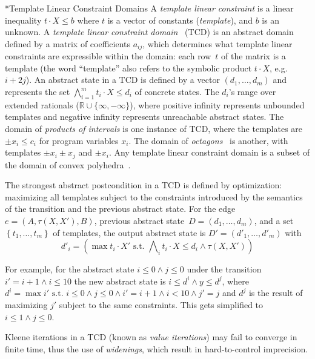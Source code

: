 \documentclass{llncs}
\makeatletter
\newcommand{\setof}[1]{\ensuremath{\left \{{#1}\right\}}}
\newcommand{\tuple}[1]{\ensuremath{\left( #1 \right) }}
\newcommand{\union}{\cup}
\newcommand{\Real}{\ensuremath{\mathbb{R}}}
\renewcommand{\paragraph}{\@startsection{paragraph}{4}{\z@}{0.8ex \@plus 0ex \@minus 1ex}{-1em}{\normalfont\normalsize\bfseries}}
\makeatother
\begin{document}
\paragraph*{Template Linear Constraint Domains}
A \emph{template linear constraint} is a linear inequality $t \cdot X \leq b$
where $t$ is a vector of constants (\emph{template}), and $b$ is an unknown.
A \emph{template linear constraint domain}~\cite{template_constraints_domain}
(TCD) is
an abstract domain defined by a matrix of coefficients $a_{ij}$, which
determines what template linear constraints are expressible within the domain:
each row~$t$ of the matrix is a template (the word ``template'' also refers to the symbolic product $t \cdot X$, e.g. $i + 2j$).
An abstract state in a TCD is defined by a vector
$(d_1,\dots,d_m)$ and represents the set
$\bigwedge_{i=1}^m t_i \cdot X \leq d_i$ of concrete states.
The $d_i$'s range over extended rationals ($\Real
\union \{\infty, -\infty\}$), where positive infinity represents unbounded templates and
negative infinity represents unreachable abstract states.
The domain of \emph{products of intervals} is one instance of TCD, where
the templates are $\pm x_i \leq c_i$ for program variables $x_i$.
The domain of \emph{octagons}~\cite{DBLP:journals/lisp/Mine06} is another, with
templates $\pm x_i \pm x_j$ and $\pm x_i$.
Any template linear constraint domain is a subset of the domain of convex polyhedra~\cite{cousot78}.

The strongest abstract postcondition in a TCD is
defined by optimization: maximizing all templates subject to the
constraints introduced by the
semantics of the transition and the previous abstract state.
For the edge $e = \tuple{A, \tau(X, X'), B}$, previous abstract state~$D = \tuple{d_1, \dots, d_m}$, and a set~$\setof{t_1, \dots, t_m}$ of templates,
the output abstract state is $D' = \tuple{d'_1, \dots, d'_m}$ with
\[d'_i = (\max t_i \cdot X' \mbox{ s.t. } \textstyle\bigwedge\nolimits_i t_i \cdot X \leq d_i \land \tau(X, X'))\]

For example, for the abstract state $i \leq 0 \land j \leq 0$ under the transition
$i' = i + 1 \land i \leq 10$ the new abstract state is $i \leq d^i \land y \leq d^j$, where
$d^i = \max i' \mbox{ s.t. } i \leq 0 \land j \leq 0 \land i' = i + 1 \land i <
10 \land j' = j$
and
$d^j$ is the result of maximizing $j'$ subject to the same constraints.
This gets simplified to $i \leq 1 \land j \leq 0$.

Kleene iterations in a TCD (known as \emph{value iterations}) may
fail to converge in finite time, thus the use of \emph{widenings}, which result in hard-to-control imprecision.
\end{document}

